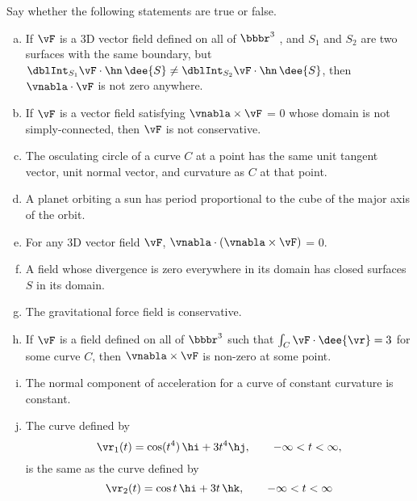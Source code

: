 \begin{question}[M317 2010D] %
Say whether the following statements are true or false.
\begin{enumerate}[(a)]
\item
If $\vF$ is a 3D vector field defined on all of $\bbbr^3$ , 
and $S_1$ and $S_2$ are two surfaces with the same boundary, but 
$\dblInt_{S_1} \vF\cdot\hn\,\dee{S} \ne  \dblInt_{S_2}  \vF\cdot\hn\,\dee{S}$, then $\vnabla\cdot\vF$ is not zero anywhere.

\item
If $\vF$ is a vector field satisfying $\vnabla\times\vF$ = 0 
whose domain is not simply-connected, then $\vF$ is not 
conservative.

\item
The osculating circle of a curve $C$ at a point has the same 
unit tangent vector, unit normal vector, and curvature as $C$ 
at that point.

\item
A planet orbiting a sun has period proportional to the cube of the 
major axis of the orbit.

\item
For any 3D vector field $\vF$, $\vnabla\cdot(\vnabla\times\vF)$ = 0.

\item
A field whose divergence is zero everywhere in its domain has
closed surfaces $S$ in its domain.

\item
The gravitational force field is conservative.

\item
If $\vF$ is a field defined on all of $\bbbr^3$ such that
$\int_C \vF \cdot \dee{\vr} = 3$ for some curve $C$, then $\vnabla\times\vF$
is non-zero at some point.

\item
The normal component of acceleration for a curve of constant curvature 
is constant.

\item
The curve defined by
\begin{equation*}
\vr_1(t) = \cos(t^4)\,\hi + 3t^4\hj,\qquad
-\infty < t < \infty,
\end{equation*}
is the same as the curve defined by
\begin{equation*}
\vr_2(t) = \cos t\,\hi + 3t\,\hk,\qquad
-\infty < t < \infty
\end{equation*}

\end{enumerate}
\end{question}

